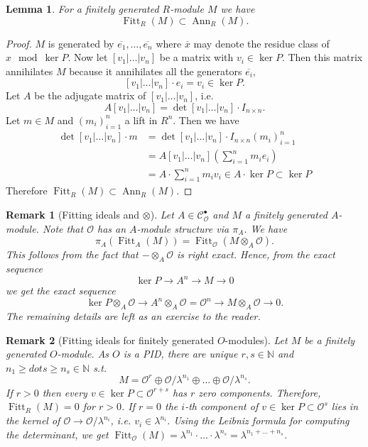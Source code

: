 \documentclass{article}
\theoremstyle{plain}%
\newtheorem{lemma}{Lemma}[section]
\newtheorem{remark}{Remark}[section]
\theoremstyle{definition}
\theoremstyle{remark}
\newcommand{\cob}{\mathcal{C}_\mathcal{O}^\bullet}
\newcommand{\ann}{\operatorname{Ann}}
\newcommand{\fitt}{\operatorname{Fitt}}
\begin{document}
\begin{lemma}\label{lem:fitting_and_ann}
    For a finitely generated \(R\)-module \(M\) we have
    \[\fitt_R(M) \subset \ann_R(M).\]
\end{lemma}
\begin{proof}
    \(M\) is generated by \(\overline{e_1}, \dots, \overline{e_n}\) where \(\overline{x}\) 
    may denote the residue class of \(x \mod \ker P\).
    Now let \([v_1|\dots|v_n]\) be a matrix with \(v_i \in \ker P\). Then this matrix annihilates \(M\) because
    it annihilates all the generators \(\overline{e_i}\),
    \[
        [v_1|\dots|v_n] \cdot e_i = v_i \in \ker P.
    \]
    Let \(A\) be the adjugate matrix of \([v_1|\dots|v_n]\), i.e. \[A[v_1|\dots|v_n] = \det [v_1|\dots|v_n]\cdot I_{n\times n}.\]
    Let \(m \in M\) and \((m_i)_{i=1}^n\) a lift in \(R^n\). Then we have 
    \begin{align*}
        \det [v_1|\dots|v_n] \cdot m &= \det [v_1|\dots|v_n]\cdot I_{n\times n} (m_i)_{i=1}^n \\
        &= A[v_1|\dots|v_n]\left(\sum_{i=1}^n m_i e_i\right)\\
        &= A \cdot \sum_{i=1}^n m_i v_i \in A \cdot \ker P \subset \ker P
    \end{align*}
    Therefore \(\fitt_R(M) \subset \ann_R(M)\).
\end{proof}

\begin{remark}[Fitting ideals and \(\otimes\)]\label{rem:fitting_and_tensor}
    Let \(A \in \cob\) and \(M\) a finitely generated \(A\)-module. 
    Note that \(\mathcal{O}\) has an \(A\)-module structure via \(\pi_A\).
    We have
    \[
        \pi_A(\fitt_A(M)) = \fitt_\mathcal{O}(M \otimes_A \mathcal{O}).
    \]
    This follows from the fact that \(- \otimes_A \mathcal{O}\) is right exact. 
    Hence, from the exact sequence
    \[
        \ker P \longrightarrow A^n \longrightarrow M \longrightarrow 0
    \]
    we get the exact sequence
    \[
        \ker P \otimes_A \mathcal{O} \longrightarrow A^n\otimes_A \mathcal{O} = \mathcal{O}^n 
        \longrightarrow M\otimes_A \mathcal{O} \longrightarrow 0.
    \]
    The remaining details are left as an exercise to the reader.
\end{remark}

\begin{remark}[Fitting ideals for finitely generated \(O\)-modules]
    Let \(M\) be a finitely generated \(O\)-module. As \(O\) is a PID, there are unique \(r,s \in \mathbb{N}\) 
    and \(n_1 \geq dots \geq n_s \in \mathbb{N}\) s.t.
    \[
        M = \mathcal{O}^r \oplus \mathcal{O}/\lambda^{n_1} \oplus \dots \oplus \mathcal{O}/\lambda^{n_s}.
    \]
    If \(r > 0\) then every \(v \in \ker P \subset \mathcal{O}^{r + s}\) has \(r\) zero components.
    Therefore, \(\fitt_R (M) = 0\) for \(r > 0\).
    If \(r = 0\) the \(i\)-th component of \(v \in \ker P \subset \mathcal{O}^s\) 
    lies in the kernel of \(\mathcal{O} \to \mathcal{O}/\lambda^{n_i}\), 
    i.e. \(v_i \in \lambda^{n_i}\).
    Using the Leibniz formula for computing the determinant, we get
    \(\fitt_\mathcal{O}(M) = \lambda^{n_1} \cdot \dots \cdot \lambda^{n_s} = \lambda^{n_1 + \dots + n_s}\).
\end{remark}
\end{document}
